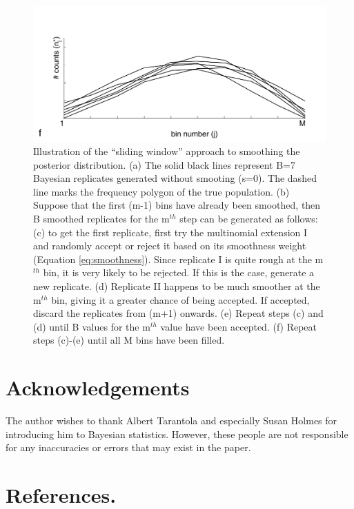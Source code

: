 \documentclass{article}
\begin{document}
\begin{figure}[h]
  \includegraphics[width=.49\textwidth]{A6.pdf}
\caption{Illustration of the ``sliding window'' approach to smoothing
the posterior  distribution. (a) The  solid black lines  represent B=7
Bayesian replicates generated without  smooting (s=0). The dashed line
marks the frequency polygon of  the true population.  (b) Suppose that
the  first (m-1)  bins have  already  been smoothed,  then B  smoothed
replicates for the  m$^{th}$ step can be generated  as follows: (c) to
get the  first replicate,  first try the  multinomial extension  I and
randomly accept or reject it  based on its smoothness weight (Equation
\ref{eq:smoothness}).   Since  replicate  I  is  quite  rough  at  the
m$^{th}$ bin, it  is very likely to be rejected. If  this is the case,
generate  a  new replicate.   (d)  Replicate  II  happens to  be  much
smoother  at the m$^{th}$  bin, giving  it a  greater chance  of being
accepted.   If accepted,  discard the  replicates from  (m+1) onwards.
(e) Repeat  steps (c) and  (d) until B  values for the  m$^{th}$ value
have been  accepted.  (f) Repeat steps  (c)-(e) until all  M bins have
been filled.}
  \label{slidingwindow}
\end{figure}

\clearpage

\section*{Acknowledgements}
The  author wishes  to  thank Albert  Tarantola  and especially  Susan
Holmes  for introducing  him  to Bayesian  statistics. However,  these
people are  not responsible  for any inaccuracies  or errors  that may
exist in the paper.

\section*{References.}
\end{document}

